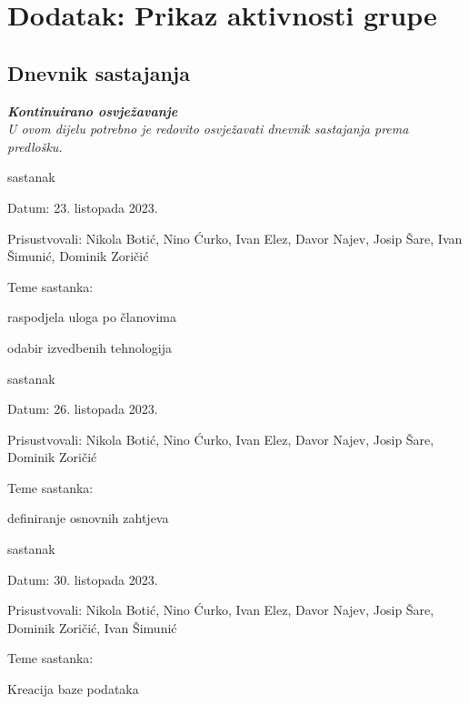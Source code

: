 \chapter*{Dodatak: Prikaz aktivnosti grupe}
		
		\section*{Dnevnik sastajanja}
		
		\textbf{\textit{Kontinuirano osvježavanje}}\\
		
		 \textit{U ovom dijelu potrebno je redovito osvježavati dnevnik sastajanja prema predlošku.}
		
		\begin{packed_enum}
			\item  sastanak
			
			\item[] \begin{packed_item}
				\item Datum: 23. listopada 2023.
				\item Prisustvovali: Nikola Botić, 
				Nino Ćurko, Ivan Elez,
				Davor Najev, Josip Šare,
				Ivan Šimunić, Dominik Zoričić
				\item Teme sastanka:
				\begin{packed_item}
					\item  raspodjela uloga po članovima
					\item  odabir izvedbenih tehnologija
				\end{packed_item}
			\end{packed_item}
			
			\item  sastanak
			\item[] \begin{packed_item}
				\item Datum: 26. listopada 2023.
				\item Prisustvovali: Nikola Botić, 
				Nino Ćurko, Ivan Elez,
				Davor Najev, Josip Šare,
				Dominik Zoričić
				\item Teme sastanka:
				\begin{packed_item}
					\item  definiranje osnovnih zahtjeva
				\end{packed_item}
			\end{packed_item}

			\item  sastanak
			\item[] \begin{packed_item}
				\item Datum: 30. listopada 2023.
				\item Prisustvovali: Nikola Botić, 
				Nino Ćurko, Ivan Elez,
				Davor Najev, Josip Šare,
				Dominik Zoričić, Ivan Šimunić
				\item Teme sastanka:
				\begin{packed_item}
					\item  Kreacija baze podataka
				\end{packed_item}
			\end{packed_item}
			

\end{packed_enum}
